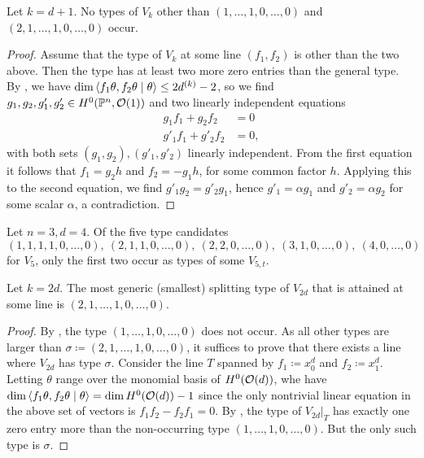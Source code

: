 \begin{proposition} \label{no-big-types-general}
	Let $k=d+1$. No types of $V_k$ other than
	$(1,\dotsc,1,0,\dotsc,0)$ and $(2,1,\dotsc,1,0,\dotsc,0)$ occur. 
\end{proposition}

\begin{proof}
	Assume that the type of $V_k$ at some line $(f_1,f_2)$ is other than the two above. Then the type has at least two more zero entries than the general type. By , we have $\dim \left\langle f_1 \theta, f_2 \theta \mid \theta \right\rangle \leq 2d^{(k)}-2$, so we find $g_1,g_2,g'_1,g'_2\in H^0(\mathbb{P}^n,\mathcal{O}(1))$ and two linearly independent equations
	\begin{align*}
		g_1f_1 + g_2f_2 &= 0 \\
		g'_1 f_1 + g'_2 f_2 &= 0,
	\end{align*}
	with both sets $(g_1,g_2), (g'_1,g'_2)$ linearly independent.
	From the first equation it follows that $f_1 = g_2 h$ and $f_2 = -g_1 h$, for some common factor $h$. Applying this to the second equation, we find $g'_1 g_2 = g'_2 g_1$, hence $g'_1 = \alpha g_1$ and $g'_2 = \alpha g_2$ for some scalar $\alpha$, a contradiction.
\end{proof}

\begin{example}
Let $n=3, d=4$. Of the five type candidates
\[
(1,1,1,1,0,\dotsc,0),\ (2,1,1,0,\dotsc,0),\ (2,2,0,\dotsc,0),\ (3,1,0,\dotsc,0),\ (4,0,\dotsc,0)
\]
for $V_5$, only the first two occur as types of some $V_{5,t}$.
\end{example}

\begin{proposition} \label{generic-splitting-type-2d}
	Let $k=2d.$ The most generic (\ie smallest) splitting type of $V_{2d}$ that is attained at some line is $(2,1,\dotsc,1,0,\dotsc,0)$.
\end{proposition}

\begin{proof}
	By , the type $(1,\dotsc,1,0,\dotsc,0)$ does not occur. As all other types are larger than $\sigma\coloneqq (2,1,\dotsc,1,0,\dotsc,0)$, it suffices to prove that there exists a line where $V_{2d}$ has type $\sigma$. Consider the line $T$ spanned by $f_1\coloneqq x_0^d$ and $f_2\coloneqq x_1^d$. Letting $\theta$ range over the monomial basis of $H^0(\mathcal{O}(d))$, whe have $\dim \left\langle f_1\theta,f_2\theta \mid \theta \right\rangle=\dim H^0(\mathcal{O}(d))-1$ since the only nontrivial linear equation in the above set of vectors is $f_1 f_2 - f_2 f_1 = 0$. By , the type of $V_{2d}|_T$ has exactly one zero entry more than the non-occurring type $(1,\dotsc,1,0,\dotsc,0)$. But the only such type is $\sigma$.
\end{proof}